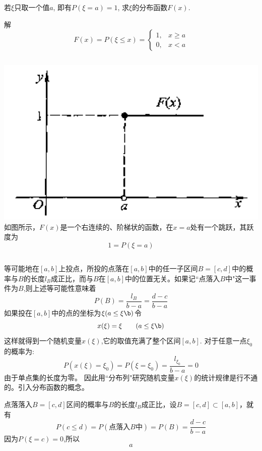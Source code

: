 \begin{frame}
\begin{example}
	若$\xi$只取一个值$a$, 即有$P(\xi=a)=1$, 求$\xi$的分布函数$F(x)$.
\end{example}
\begin{block}{解}
	\[
	 F(x)=P(\xi\le x)= 
	 \begin{cases}
	 1, &x\ge a\\
	 0, &x<a
	 \end{cases}
	\]
	\begin{columns}
		\includegraphics[scale=0.3]{fx1}
		如图所示，$F(x)$是一个右连续的、阶梯状的函数，在$x=a$处有一个跳跃，其跃度为
		\[1=P(\xi=a)\]
	\end{columns}
\end{block}
\end{frame}

\begin{frame}
\begin{example}
	等可能地在$[a,b]$上投点，所投的点落在$[a,b]$中的任一子区间$B=[c,d]$中的概率与$B$的长度$l_B$成正比，而与$B$在$[a,b]$中的位置无关。如果记``点落入$B$中"这一事件为$B$,则上述等可能性意味着
	\[P(B)=\frac{l_B}{b-a}=\frac{d-c}{b-a}\]
	如果投在$[a,b]$中的点的坐标为$\xi(a\le\xi\b)$令
	\[x(\xi)=\xi\qquad (a\le\xi\b)\]
	这样就得到一个随机变量$x(\xi)$,它的取值充满了整个区间$[a,b]$.
	对于任意一点$\xi_0$的概率为: 
	\[P(x(\xi)=\xi_0)=P(\xi=\xi_0)=\frac{l_{\xi_0}}{b-a}=0\]
	由于单点集的长度为零。
	因此用``分布列"研究随机变量$x(\xi)$的统计规律是行不通的。引入分布函数的概念。
\end{example}
\end{frame}

\begin{frame}
点落落入$B=[c,d]$区间的概率与$B$的长度$l_B$成正比，设$B=[c,d]\subset [a,b]$，就有
	\[P(c\le d)=P(\text{点落入$B$中})=P(B)=\frac{d-c}{b-a} \]
	因为$P(\xi =c)=0$,所以
	\[a\]
\end{frame}

